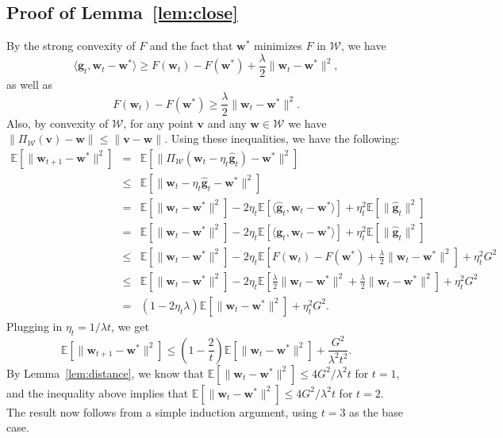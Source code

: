 \documentclass{article}
\newcommand{\E}{\mathbb{E}}
\newcommand{\bw}{\mathbf{w}}
\newcommand{\bv}{\mathbf{v}}
\newcommand{\bg}{\mathbf{g}}
\newcommand{\Wcal}{\mathcal{W}}
\newcommand{\norm}[1]{\|#1\|}
\newcommand{\inner}[1]{\langle#1\rangle}
\newcommand{\lemref}[1]{Lemma~\ref{#1}}
\begin{document}
\subsection{Proof of \lemref{lem:close}}\label{app:close}

By the strong convexity of $F$ and the fact that $\bw^*$ minimizes $F$ in $\Wcal$, we have
\[
\inner{\bg_t,\bw_t-\bw^{*}} \geq F(\bw_t)-F(\bw^{*})+\frac{\lambda}{2}\norm{\bw_t-\bw^{*}}^2,
\]
as well as
\[
F(\bw_t)-F(\bw^*) \geq \frac{\lambda}{2}\norm{\bw_t-\bw^{*}}^2.
\]
Also, by convexity of $\Wcal$, for any point $\bv$ and any $\bw\in \Wcal$ we have $\norm{\Pi_{\Wcal}(\bv)-\bw}\leq \norm{\bv-\bw}$. Using these inequalities, we have the following:
\begin{eqnarray*}
    \E\left[\norm{\bw_{t+1}-\bw^{*}}^2\right] &=& \E[\norm{\Pi_{\Wcal}(\bw_{t}-\eta_t \hat{\bg}_t)-\bw^{*}}^2]\\
    &\leq& \E\left[\norm{\bw_{t}-\eta_t \hat{\bg}_t-\bw^{*}}^2\right]\\
    &=& \E\left[\norm{\bw_t-\bw^{*}}^2\right]-2\eta_t \E[\inner{\hat{\bg}_t,\bw_t-\bw^{*}}]+\eta_t^2\E[\norm{\hat{\bg}_t}^2]\\
    &=& \E\left[\norm{\bw_t-\bw^{*}}^2\right]-2\eta_t \E[\inner{\bg_t,\bw_t-\bw^{*}}]+\eta_t^2\E[\norm{\hat{\bg}_t}^2]\\
    &\leq& \E\left[\norm{\bw_t-\bw^{*}}^2\right]-2\eta_t \E\left[F(\bw_t)-F(\bw^{*})+\frac{\lambda}{2}\norm{\bw_t-\bw^{*}}^2\right]+\eta_t^2 G^2\\
    &\leq& \E\left[\norm{\bw_t-\bw^{*}}^2\right]-2\eta_t \E\left[\frac{\lambda}{2}\norm{\bw_t-\bw^{*}}^2+\frac{\lambda}{2}\norm{\bw_t-\bw^{*}}^2\right]+\eta_t^2 G^2\\
    &=& (1-2\eta_t \lambda)\E\left[\norm{\bw_t-\bw^{*}}^2\right]+\eta_t^2 G^2.
\end{eqnarray*}
Plugging in $\eta_t = 1/\lambda t$, we get
\[
\E\left[\norm{\bw_{t+1}-\bw^{*}}^2\right] \leq \left(1-\frac{2}{t}\right)\E\left[\norm{\bw_t-\bw^{*}}^2\right]+\frac{G^2}{\lambda^2 t^2}.
\]
By \lemref{lem:distance}, we know that $\E\left[\norm{\bw_{t}-\bw^{*}}^2\right]\leq 4G^2/\lambda^2 t$ for $t=1$, and the inequality above implies that $\E\left[\norm{\bw_{t}-\bw^{*}}^2\right]\leq 4G^2/\lambda^2 t$ for $t=2$. The result now follows from a simple induction argument, using $t=3$ as the base case.
\end{document}
